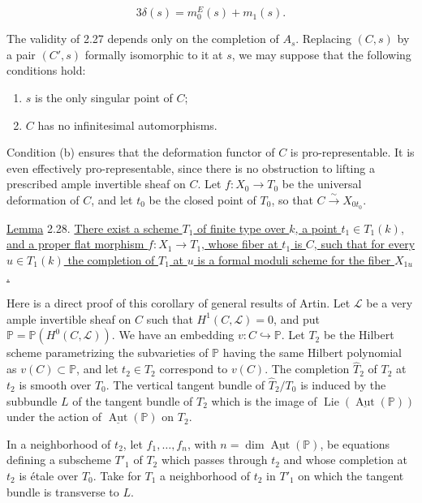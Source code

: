 \begin{equation*}
3\delta(s)=m_0^E(s)+m_1(s).
\end{equation*}


The validity of 2.27 depends only on the completion of $A_s$.  Replacing
$(C,s)$ by a pair $(C',s)$ formally isomorphic to it at $s$, we may suppose
that the following conditions hold:

\begin{enumerate}[label=(\alph*),leftmargin=1.2cm]
\item $s$ is the only singular point of $C$;
\item $C$ has no infinitesimal automorphisms.
\end{enumerate}

Condition (b) ensures that the deformation functor of $C$ is pro-representable.
It is even effectively pro-representable, since there is no obstruction to
lifting a prescribed ample invertible sheaf on $C$.  Let
$f:X_0\longrightarrow T_0$ be the universal deformation of $C$, and let $t_0$
be the closed point of $T_0$, so that $C\overset\sim\longrightarrow X_{0t_0}$.

\underline{Lemma} 2.28. \underline{There exist a scheme $T_1$ of finite type
over $k$, a point $t_1\in T_1(k)$, and a proper flat morphism
$f:X_1\longrightarrow T_1$, whose fiber at $t_1$ is $C$, such that for every
$u\in T_1(k)$ the completion of $T_1$ at $u$ is a formal moduli scheme for the
fiber $X_{1u}$.}

Here is a direct proof of this corollary of general results of Artin.  Let
$\mathcal L$ be a very ample invertible sheaf on $C$ such that
$H^1(C,\mathcal L)=0$, and put
$\mathbb P=\mathbb P(H^0(C,\mathcal L))$.  We have an embedding
$v:C\hookrightarrow\mathbb P$.  Let $T_2$ be the Hilbert scheme parametrizing
the subvarieties of $\mathbb P$ having the same Hilbert polynomial as
$v(C)\subset\mathbb P$, and let $t_2\in T_2$ correspond to $v(C)$.  The
completion $\widehat T_2$ of $T_2$ at $t_2$ is smooth over $T_0$.  The vertical
tangent bundle of $\widehat T_2/T_0$ is induced by the subbundle $L$ of the
tangent bundle of $T_2$ which is the image of
$\operatorname{Lie}(\underline{\operatorname{Aut}}(\mathbb P))$ under the
action of $\underline{\operatorname{Aut}}(\mathbb P)$ on $T_2$.

In a neighborhood of $t_2$, let $f_1,\ldots,f_n$, with
$n=\dim\underline{\operatorname{Aut}}(\mathbb P)$, be equations defining a
subscheme $T'_1$ of $T_2$ which passes through $t_2$ and whose completion at
$t_2$ is étale over $T_0$.  Take for $T_1$ a neighborhood of $t_2$ in $T'_1$
on which the tangent bundle is transverse to $L$.

